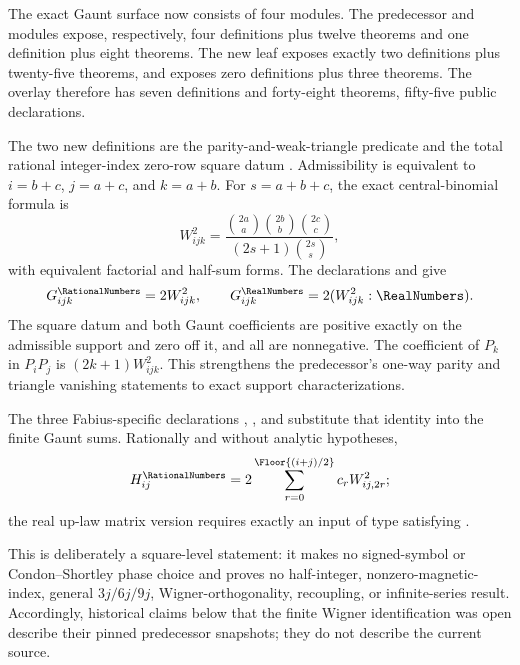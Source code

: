 \documentclass[11pt]{article}
\theoremstyle{definition}
\theoremstyle{remark}
\begin{document}
\begin{remark}
The exact Gaunt surface now consists of four modules.  The predecessor
 and  modules expose,
respectively, four definitions plus twelve theorems and one definition plus eight
theorems.  The new  leaf exposes exactly two
definitions plus twenty-five theorems, and
 exposes zero definitions plus three
theorems.  The overlay therefore has seven definitions and forty-eight theorems,
fifty-five public declarations.

The two new definitions are the parity-and-weak-triangle predicate
 and the total rational integer-index zero-row square
datum .  Admissibility is equivalent to
\(i=b+c\), \(j=a+c\), and \(k=a+b\).  For \(s=a+b+c\), the exact central-binomial
formula is
\[
 W_{ijk}^{2}=
 \frac{\binom{2a}{a}\binom{2b}{b}\binom{2c}{c}}
      {(2s+1)\binom{2s}{s}},
\]
with equivalent factorial and half-sum forms.  The declarations
 and
 give
\[
 G_{ijk}^{\RationalNumbers}=2W_{ijk}^{2},
 \qquad
 G_{ijk}^{\RealNumbers}=2(W_{ijk}^{2}:\RealNumbers).
\]
The square datum and both Gaunt coefficients are positive exactly on the
admissible support and zero off it, and all are nonnegative.  The coefficient of
\(P_k\) in \(P_iP_j\) is \((2k+1)W_{ijk}^{2}\).  This strengthens the predecessor's
one-way parity and triangle vanishing statements to exact support characterizations.

The three Fabius-specific declarations
,
, and
substitute that identity into the finite Gaunt sums.  Rationally and without analytic
hypotheses,
\[
 H_{ij}^{\RationalNumbers}=2\sum_{r=0}^{\Floor{(i+j)/2}}c_rW_{ij,2r}^{2};
\]
the real up-law matrix version requires exactly an input of type
 satisfying .

This is deliberately a square-level statement: it makes no signed-symbol or
Condon--Shortley phase choice and proves no half-integer, nonzero-magnetic-index,
general \(3j/6j/9j\), Wigner-orthogonality, recoupling, or infinite-series result.
Accordingly, historical claims below that the finite Wigner identification was open
describe their pinned predecessor snapshots; they do not describe the current source.
\end{remark}
\end{document}
